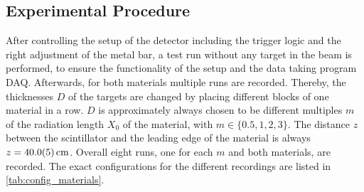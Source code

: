 \documentclass[sn-mathphys-num,iicol]{sn-jnl}
\theoremstyle{thmstyleone}
\theoremstyle{thmstyletwo}
\theoremstyle{thmstylethree}
\begin{document}
\subsection{Experimental Procedure}
After controlling the setup of the detector including the trigger logic and the right adjustment of the metal bar, a test run without any target in the beam is performed, to ensure the functionality of the setup and the data taking program DAQ.
Afterwards, for both materials multiple runs are recorded. Thereby, the thicknesses $D$ of the targets are changed by placing different blocks of one material in a row. $D$ is approximately always chosen to be different multiples $m$ of the radiation length $X_0$ of the material, with $m\in\{0.5,1,2,3\}$. The distance $z$ between the scintillator and the leading edge of the material is always $z=\SI{40\pm0.5}{cm}$. Overall eight runs, one for each $m$ and both materials, are recorded. The exact configurations for the different recordings are listed in \autoref{tab:config_materials}.
\end{document}
